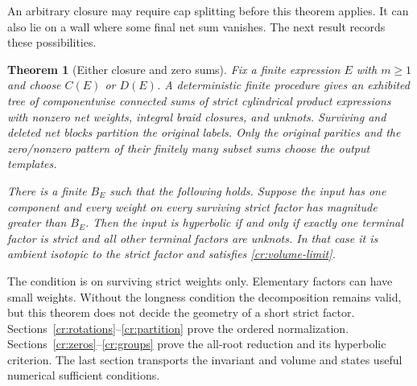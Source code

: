 \documentclass[11pt]{article}
\numberwithin{equation}{section}
\newtheorem{theorem}{Theorem}[section]
\theoremstyle{definition}\newtheorem{definition}[theorem]{Definition}
\theoremstyle{remark}\newtheorem{remark}[theorem]{Remark}
\begin{document}
An arbitrary closure may require cap splitting before this theorem applies. It can also lie on a wall where some final net sum vanishes. The next result records these possibilities.

\begin{theorem}[Either closure and zero sums]\label{cr:arbitrary}
Fix a finite expression $E$ with $m\ge1$ and choose $C(E)$ or $D(E)$. A deterministic finite procedure gives an exhibited tree of componentwise connected sums of strict cylindrical product expressions with nonzero net weights, integral braid closures, and unknots. Surviving and deleted net blocks partition the original labels. Only the original parities and the zero/nonzero pattern of their finitely many subset sums choose the output templates.

There is a finite $B_E$ such that the following holds. Suppose the input has one component and every weight on every surviving strict factor has magnitude greater than $B_E$. Then the input is hyperbolic if and only if exactly one terminal factor is strict and all other terminal factors are unknots. In that case it is ambient isotopic to the strict factor and satisfies \eqref{cr:volume-limit}.
\end{theorem}

The condition is on surviving strict weights only. Elementary factors can have small weights. Without the longness condition the decomposition remains valid, but this theorem does not decide the geometry of a short strict factor. Sections~\ref{cr:rotations}--\ref{cr:partition} prove the ordered normalization. Sections~\ref{cr:zeros}--\ref{cr:groups} prove the all-root reduction and its hyperbolic criterion. The last section transports the invariant and volume and states useful numerical sufficient conditions.





\end{document}
